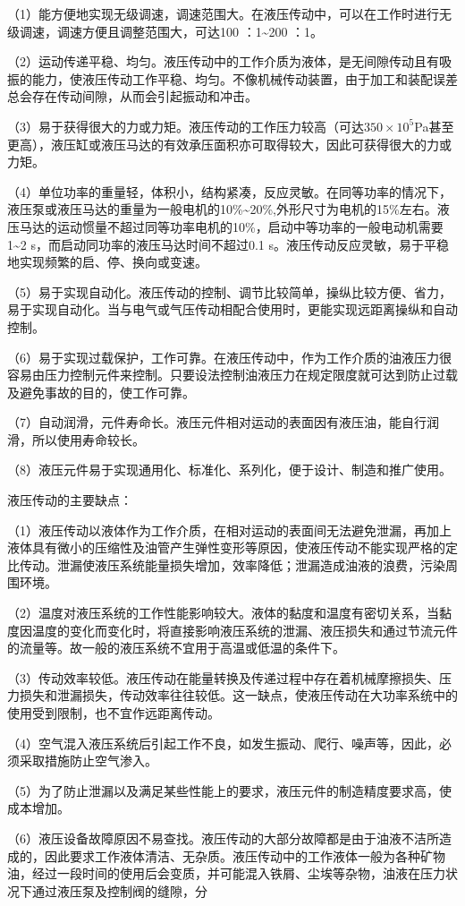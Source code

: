     （1）能方便地实现无级调速，调速范围大。在液压传动中，可以在工作时进行无级调速，调速方便且调整范围大，可达100 ：1\textasciitilde200 ：1。

    （2）运动传递平稳、均匀。液压传动中的工作介质为液体，是无间隙传动且有吸振的能力，使液压传动工作平稳、均匀。不像机械传动装置，由于加工和装配误差总会存在传动间隙，从而会引起振动和冲击。

    （3）易于获得很大的力或力矩。液压传动的工作压力较高（可达$350\times{10^5}$Pa甚至更高），液压缸或液压马达的有效承压面积亦可取得较大，因此可获得很大的力或力矩。

    （4）单位功率的重量轻，体积小，结构紧凑，反应灵敏。在同等功率的情况下，液压泵或液压马达的重量为一般电机的10\%\textasciitilde20\%,外形尺寸为电机的15\%左右。液压马达的运动惯量不超过同等功率电机的10\%，启动中等功率的一般电动机需要1\textasciitilde2 s，而启动同功率的液压马达时间不超过0.1 s。液压传动反应灵敏，易于平稳地实现频繁的启、停、换向或变速。

    （5）易于实现自动化。液压传动的控制、调节比较简单，操纵比较方便、省力，易于实现自动化。当与电气或气压传动相配合使用时，更能实现远距离操纵和自动控制。

    （6）易于实现过载保护，工作可靠。在液压传动中，作为工作介质的油液压力很容易由压力控制元件来控制。只要设法控制油液压力在规定限度就可达到防止过载及避免事故的目的，使工作可靠。

    （7）自动润滑，元件寿命长。液压元件相对运动的表面因有液压油，能自行润滑，所以使用寿命较长。

    （8）液压元件易于实现通用化、标准化、系列化，便于设计、制造和推广使用。

    液压传动的主要缺点：

    （1）液压传动以液体作为工作介质，在相对运动的表面间无法避免泄漏，再加上液体具有微小的压缩性及油管产生弹性变形等原因，使液压传动不能实现严格的定比传动。泄漏使液压系统能量损失增加，效率降低；泄漏造成油液的浪费，污染周围环境。

    （2）温度对液压系统的工作性能影响较大。液体的黏度和温度有密切关系，当黏度因温度的变化而变化时，将直接影响液压系统的泄漏、液压损失和通过节流元件的流量等。故一般的液压系统不宜用于高温或低温的条件下。

    （3）传动效率较低。液压传动在能量转换及传递过程中存在着机械摩擦损失、压力损失和泄漏损失，传动效率往往较低。这一缺点，使液压传动在大功率系统中的使用受到限制，也不宜作远距离传动。

    （4）空气混入液压系统后引起工作不良，如发生振动、爬行、噪声等，因此，必须采取措施防止空气渗入。

    （5）为了防止泄漏以及满足某些性能上的要求，液压元件的制造精度要求高，使成本增加。
    
    （6）液压设备故障原因不易查找。液压传动的大部分故障都是由于油液不洁所造成的，因此要求工作液体清洁、无杂质。液压传动中的工作液体一般为各种矿物油，经过一段时间的使用后会变质，并可能混入铁屑、尘埃等杂物，油液在压力状况下通过液压泵及控制阀的缝隙，分








